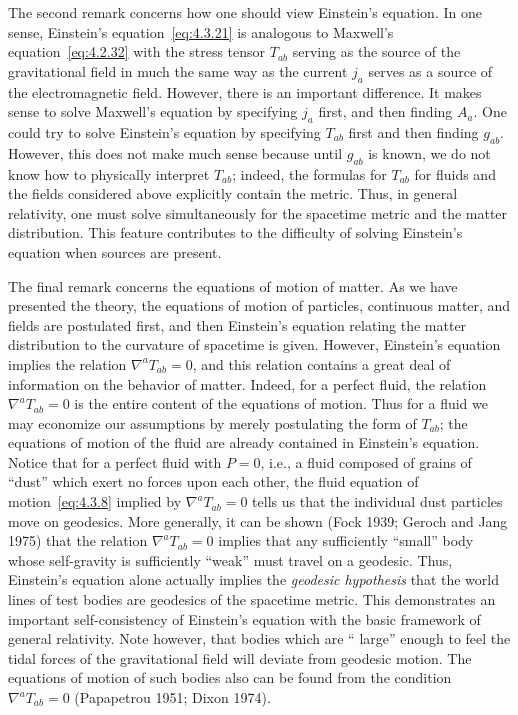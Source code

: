 The second remark concerns how one should view Einstein's equation. In one sense,
Einstein's equation~\eqref{eq:4.3.21} is analogous to Maxwell's
equation~\eqref{eq:4.2.32} with the stress tensor \(T_{ab}\) serving as the
source of the gravitational field in much the same way as the current \(j_a\)
serves as a source of the electromagnetic field. However, there is an important
difference. It makes sense to solve Maxwell's equation by specifying \(j_a\)
first, and then finding \(A_a\). One could try to solve Einstein's equation by
specifying \(T_{ab}\) first and then finding \(g_{ab}\). However, this does not
make much sense because until \(g_{ab}\) is known, we do not know how to
physically interpret \(T_{ab}\); indeed, the formulas for \(T_{ab}\) for fluids
and the fields considered above explicitly contain the metric. Thus, in general
relativity, one must solve simultaneously for the spacetime metric and the matter
distribution. This feature contributes to the difficulty of solving Einstein's
equation when sources are present.

The final remark concerns the equations of motion of matter. As we have presented
the theory, the equations of motion of particles, continuous matter, and fields are
postulated first, and then Einstein's equation relating the matter distribution to
the curvature of spacetime is given. However, Einstein's equation implies the
relation \(\nabla^aT_{ab}=0\), and this relation contains a great deal of
information on the behavior of matter. Indeed, for a perfect fluid, the relation
\(\nabla^aT_{ab}=0\) is the entire content of the equations of motion. Thus
for a fluid we may economize our assumptions by merely postulating the form of
\(T_{ab}\); the equations of motion of the fluid are already contained in
Einstein's equation. Notice that for a perfect fluid with \(P=0\), i.e., a fluid
composed of grains of \textquotedblleft dust\textquotedblright{} which exert no
forces upon each other, the fluid equation of motion~\eqref{eq:4.3.8} implied by
\(\nabla^aT_{ab}=0\) tells us that the individual dust particles move on
geodesics. More generally, it can be shown (Fock 1939; Geroch and Jang 1975)
that the relation \(\nabla^aT_{ab}=0\) implies that any sufficiently
\textquotedblleft small\textquotedblright{} body whose self-gravity is sufficiently
\textquotedblleft weak\textquotedblright{} must travel on a geodesic. Thus,
Einstein's equation alone actually implies the \emph{geodesic hypothesis} that the
world lines of test bodies are geodesics of the spacetime metric. This demonstrates
an important self-consistency of Einstein's equation with the basic framework of
general relativity. Note however, that bodies which are \textquotedblleft
large\textquotedblright{} enough to feel the tidal forces of the gravitational field
will deviate from geodesic motion. The equations of motion of such bodies also can
be found from the condition \(\nabla^aT_{ab}=0\) (Papapetrou 1951; Dixon
1974).
